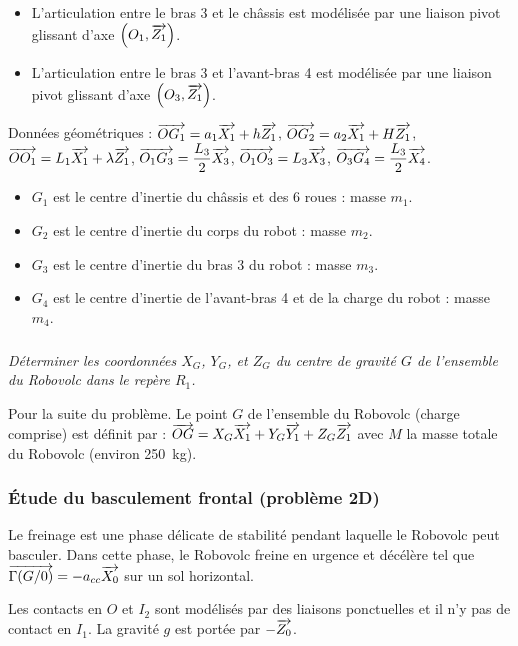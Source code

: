 \documentclass[10pt,fleqn]{article} %
\begin{document}
\begin{multicols}{2}
\begin{itemize}
\item L’articulation entre le bras 3 et le châssis est modélisée par une liaison pivot glissant d’axe $\left(O_1,\overrightarrow{Z_1}\right)$.
\item L’articulation entre le bras 3 et l'avant-bras 4 est modélisée par une liaison pivot glissant d’axe $\left(O_3,\overrightarrow{Z_1}\right)$.
\end{itemize}

Données géométriques : $\overrightarrow{OG_1}=a_1\overrightarrow{X_1}+h\overrightarrow{Z_1}$, $\overrightarrow{OG_2}=a_2\overrightarrow{X_1}+H\overrightarrow{Z_1}$, $\overrightarrow{OO_1}=L_1\overrightarrow{X_1}+\lambda\overrightarrow{Z_1}$, $\overrightarrow{O_1G_3}=\dfrac{L_3}{2}\overrightarrow{X_3}$, $\overrightarrow{O_1O_3}=L_3\overrightarrow{X_3}$, $\overrightarrow{O_3G_4}=\dfrac{L_3}{2}\overrightarrow{X_4}$.

\begin{itemize}
\item $G_1$ est le centre d’inertie du châssis et des 6 roues : masse $m_1$.
\item $G_2$ est le centre d’inertie du corps du robot : masse $m_2$.
\item $G_3$ est le centre d’inertie du bras 3 du robot : masse $m_3$.
\item $G_4$ est le centre d’inertie de l’avant-bras 4 et de la charge du robot : masse $m_4$.
\end{itemize}



\subparagraph{}
\textit{Déterminer les coordonnées $X_G$, $Y_G$, et $Z_G$ du centre de gravité $G$ de l’ensemble du Robovolc dans le repère $R_1$.}
\ifprof
\begin{corrige}
\end{corrige}
\else
\fi


Pour la suite du problème. Le point $G$ de l’ensemble du Robovolc (charge comprise) est définit par : $\overrightarrow{OG}=X_G\overrightarrow{X_1}+Y_G\overrightarrow{Y_1}+Z_G\overrightarrow{Z_1}$ avec $M$ la masse totale du Robovolc (environ \SI{250}{kg}).


\subsubsection*{Étude du basculement frontal (problème 2D)}
Le freinage est une phase délicate de stabilité pendant laquelle le Robovolc peut basculer. Dans cette phase, le Robovolc freine en urgence et décélère tel que $\overrightarrow{\Gamma(G/0)}=-a_{cc}\overrightarrow{X_0}$ sur un sol horizontal.

\begin{hypo}
Les contacts en $O$ et $I_2$ sont modélisés par des liaisons ponctuelles et il n’y pas de contact en $I_1$. La gravité $g$ est portée par $-\overrightarrow{Z_0}$.


\end{hypo}
\end{multicols}
\end{document}
